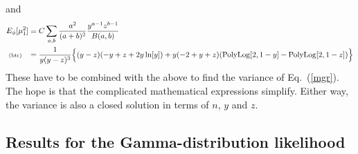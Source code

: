 \documentclass[11pt]{article}
\newcommand{\lleq}[1]{\label{#1} }
\renewcommand{\lleq}[1]{\label{#1} {\scriptstyle {\rm (#1)}} \hspace*{2ex} }
\begin{document}
and
\begin{align}
  E_\phi[\mu_1^2] &= C\sum_{a,b} \frac{a^2}{(a+b)^2}
  \frac{y^{a-1}z^{b-1}}{B(a,b)}
  \nonumber\\
  \lleq{btr} %
  &= \frac{1}{y (y - z)^3}
  \Bigl\{
  (y - z) (-y + z + 2 y \ln[y]) + y (-2 + y + z)
  (\mathrm{PolyLog}[2, 1 - y] - \mathrm{PolyLog}[2, 1 - z])
  \Bigr\}
\end{align}
These have to be combined with the above to find the variance of
Eq.~(\ref{mgr}). The hope is that the complicated mathematical
expressions simplify. Either way, the variance is also a closed
solution in terms of $n$, $y$ and $z$.

\subsection{Results for the Gamma-distribution likelihood}
\end{document}
